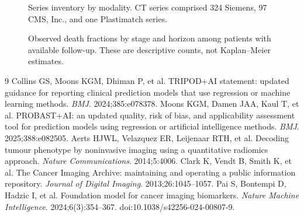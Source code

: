 \documentclass[11pt]{article}
\begin{document}
\begin{figure}[H]
\centering
{}
\caption{Series inventory by modality. CT series comprised 324 Siemens, 97 CMS, Inc., and one Plastimatch series.}
\end{figure}

\begin{figure}[H]
\centering
{}
\caption{Observed death fractions by stage and horizon among patients with available follow-up. These are descriptive counts, not Kaplan--Meier estimates.}
\end{figure}

\begin{thebibliography}{9}
 Collins GS, Moons KGM, Dhiman P, et al. TRIPOD+AI statement: updated guidance for reporting clinical prediction models that use regression or machine learning methods. \textit{BMJ}. 2024;385:e078378.
 Moons KGM, Damen JAA, Kaul T, et al. PROBAST+AI: an updated quality, risk of bias, and applicability assessment tool for prediction models using regression or artificial intelligence methods. \textit{BMJ}. 2025;388:e082505.
 Aerts HJWL, Velazquez ER, Leijenaar RTH, et al. Decoding tumour phenotype by noninvasive imaging using a quantitative radiomics approach. \textit{Nature Communications}. 2014;5:4006.
 Clark K, Vendt B, Smith K, et al. The Cancer Imaging Archive: maintaining and operating a public information repository. \textit{Journal of Digital Imaging}. 2013;26:1045--1057.
 Pai S, Bontempi D, Hadzic I, et al. Foundation model for cancer imaging biomarkers. \textit{Nature Machine Intelligence}. 2024;6(3):354--367. doi:10.1038/s42256-024-00807-9.
\end{thebibliography}
\end{document}
